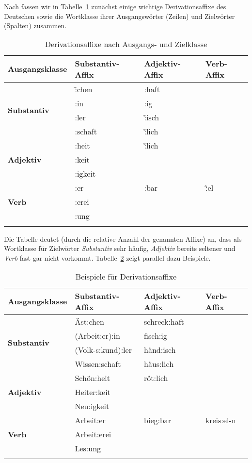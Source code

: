 Nach \citet[267]{Eisenberg1} fassen wir in Tabelle~\ref{tab:derivaffixe} zunächst einige wichtige Derivationsaffixe des Deutschen sowie die Wortklasse ihrer Ausgangswörter (Zeilen) und Zielwörter (Spalten) zusammen.

\begin{table}
  \centering
  \begin{tabular}{llll}
    \lsptoprule
    \textbf{Ausgangsklasse} & \textbf{Substantiv-Affix} & \textbf{Adjektiv-Affix} & \textbf{Verb-Affix} \\
   \midrule
   \multirow{4}{*}{\textbf{Substantiv}} & \~:chen & :haft & \\
   & :in & :ig & \\
   & :ler & \~:isch & \\
   & :schaft & \~:lich & \\
   \midrule
   \multirow{3}{*}{\textbf{Adjektiv}} & :heit & \~:lich & \\
    & :keit && \\
    & :igkeit && \\
   \midrule
   \multirow{3}{*}{\textbf{Verb}} & :er & :bar & \~:el \\
   & :erei && \\
   & :ung && \\
   \lspbottomrule
  \end{tabular}
  \caption{Derivationsaffixe nach Ausgangs- und Zielklasse}
  \label{tab:derivaffixe}
\end{table}

Die Tabelle deutet (durch die relative Anzahl der genannten Affixe) an, dass als Wortklasse für Zielwörter \textit{Substantiv} sehr häufig, \textit{Adjektiv} bereits seltener und \textit{Verb} fast gar nicht vorkommt.
Tabelle~\ref{tab:derivaffixex} zeigt parallel dazu Beispiele.

\begin{table}
  \centering
  \begin{tabular}{llll}
    \lsptoprule
    \textbf{Ausgangsklasse} & \textbf{Substantiv-Affix} & \textbf{Adjektiv-Affix} & \textbf{Verb-Affix} \\
   \midrule
   \multirow{4}{*}{\textbf{Substantiv}} & Äst:chen & schreck:haft & \\
   & (Arbeit:er):in & fisch:ig & \\
   & (Volk-s:kund):ler & händ:isch & \\
   & Wissen:schaft & häus:lich & \\
   \midrule
   \multirow{3}{*}{\textbf{Adjektiv}} & Schön:heit & röt:lich & \\
    & Heiter:keit && \\
    & Neu:igkeit && \\
   \midrule
   \multirow{3}{*}{\textbf{Verb}} & Arbeit:er & bieg:bar & kreis:el-n \\
   & Arbeit:erei && \\
   & Les:ung && \\
   \lspbottomrule
  \end{tabular}
  \caption{Beispiele für Derivationsaffixe}
  \label{tab:derivaffixex}
\end{table}

